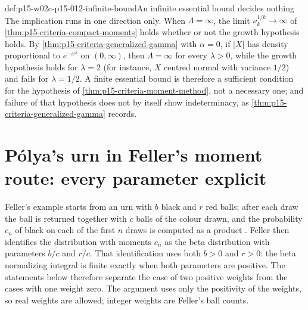 \begin{hbwarning}{def:p15-w02c-p15-012-infinite-bound}{An infinite essential bound decides nothing}
The implication runs in one direction only. When \(\Lambda=\infty\), the
limit \(\nu_k^{1/k}\to\infty\) of \cref{thm:p15-criteria-compact-moments}
holds whether or not the growth hypothesis holds.
By \cref{thm:p15-criteria-generalized-gamma} with \(\alpha=0\), if \(|X|\)
has density proportional to \(e^{-x^\lambda}\) on \((0,\infty)\), then
\(\Lambda=\infty\) for every \(\lambda>0\), while the growth hypothesis
holds for \(\lambda=2\) (for instance, \(X\) centred normal with variance \(1/2\)) and
fails for \(\lambda=1/2\). A finite essential bound is therefore a
sufficient condition for the hypothesis of
\cref{thm:p15-criteria-moment-method}, not a necessary one; and failure of
that hypothesis does not by itself show indeterminacy, as
\cref{thm:p15-criteria-generalized-gamma} records.
\end{hbwarning}

\section{P\'olya's urn in Feller's moment route: every parameter explicit}
\label{sec:p15-w02c-p15-012-urn-parameters}

Feller's example starts from an urn with \(b\) black and \(r\) red balls;
after each draw the ball is returned together with \(c\) balls of the
colour drawn, and the probability \(c_n\) of black on each of the first
\(n\) draws is computed as a product
\cite[vol.~II, VII.4, Example~(a), pp.~229--230]{Feller1971ProbabilityII}.
Feller then identifies the distribution with moments \(c_n\) as the beta
distribution with parameters \(b/c\) and \(r/c\). That identification
uses both \(b>0\) and \(r>0\): the beta normalizing integral is finite
exactly when both parameters are positive. The statements below therefore
separate the case of two positive weights from the cases with one weight
zero. The argument uses only the positivity of the weights, so real
weights are allowed; integer weights are Feller's ball counts.

